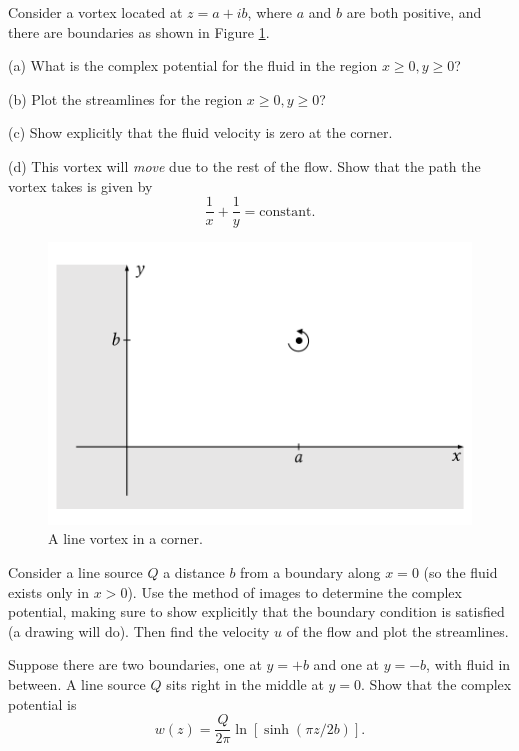 \begin{problem}
Consider a vortex located at $z = a + ib$, where $a$ and $b$ are both positive, and there are boundaries as shown in Figure \ref{fig_vortex_corner}.  

(a) What is the complex potential for the fluid in the region $x \ge 0, y \ge 0$?

(b) Plot the streamlines for the region $x \ge 0, y \ge 0$?

(c) Show explicitly that the fluid velocity is zero at the corner.

(d) This vortex will \emph{move} due to the rest of the flow.  Show that the path the vortex takes is given by
\[
\frac{1}{x} + \frac{1}{y} = \text{constant}.
\]
\end{problem}

\begin{figure}
\centering\includegraphics[width=0.75\linewidth]{Figures/Chapter4/fig_vortex_corner}
\caption{A line vortex in a corner.}
\label{fig_vortex_corner}
\end{figure}

\begin{problem}
Consider a line source $Q$ a distance $b$ from a boundary along $x = 0$ (so the fluid exists only in $x>0$).  Use the method of images to determine the complex potential, making sure to show explicitly that the boundary condition is satisfied (a drawing will do).  Then find the velocity $u$ of the flow and plot the streamlines.
\end{problem}

\begin{problem}
Suppose there are two boundaries, one at $y = +b$ and one at $y = -b$, with fluid in between.  A line source $Q$ sits right in the middle at $y = 0$.  Show that the complex potential is
\[
w(z) = \frac{Q}{2\pi} \ln \left[ \sinh \left( \pi z / 2b \right) \right].
\]
\end{problem}

